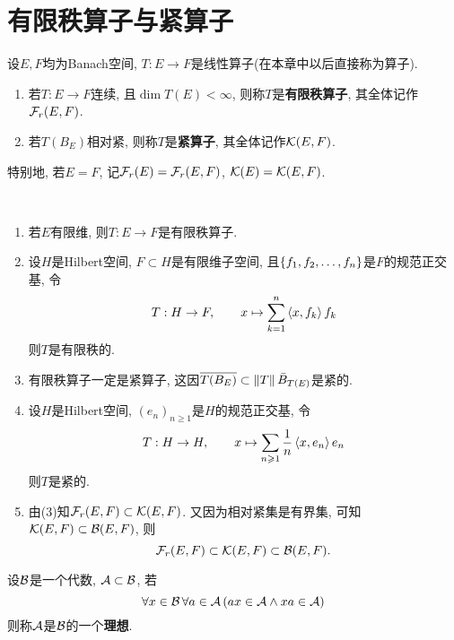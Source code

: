 \section{有限秩算子与紧算子}

    \begin{Definition}
    设$ E, F $均为Banach空间, $ T : E\to F $是线性算子(在本章中以后直接称为算子).
    \begin{enumerate}[(1)]
    \item 若$ T : E\to F $连续, 且$ \dim T(E)<\infty $, 则称$ T $是\textbf{有限秩算子}, 其全体记作$ \mathcal{F}_{r}(E,F) $.
    \item 若$ T(B_E) $相对紧, 则称$ T $是\textbf{紧算子}, 其全体记作$ \mathcal{K}(E,F) $.
    \end{enumerate}
    特别地, 若$ E=F $, 记$ \mathcal{F}_{r}(E)=\mathcal{F}_{r}(E,F) $, $ \mathcal{K}(E)=\mathcal{K}(E,F) $.
    \end{Definition}

    \begin{Example}~
    \begin{enumerate}[(1)]
    \item 若$ E $有限维, 则$ T : E\to F $是有限秩算子.
    \item 设$ H $是Hilbert空间, $ F\subset H $是有限维子空间, 且$ \{ f_{1}, f_{2}, \dots, f_{n} \} $是$ F $的规范正交基, 令
    \[
    T : H\to F,\qquad x\mapsto\sum_{k=1}^n\left\langle x,f_k \right\rangle f_k
    \]
    则$ T $是有限秩的.
    \item 有限秩算子一定是紧算子, 这因$ \overline{T(B_E)}\subset\left\| T \right\|\bar{B}_{T(E)} $是紧的.
    \item 设$ H $是Hilbert空间, $ (e_n)_{n\geqslant 1} $是$ H $的规范正交基, 令
    \[
    T : H\to H,\qquad x\mapsto\sum_{n\geqslant 1}\frac{1}{n}\left\langle x,e_n \right\rangle e_n
    \]
    则$ T $是紧的.
    \item 由(3)知$ \mathcal{F}_{r}(E,F)\subset\mathcal{K}(E,F) $. 又因为相对紧集是有界集, 可知$ \mathcal{K}(E,F)\subset\mathcal{B}(E,F) $, 则
    \[
    \mathcal{F}_{r}(E,F)\subset\mathcal{K}(E,F)\subset\mathcal{B}(E,F).
    \]
    \end{enumerate}
    \end{Example}

    \begin{Definition}[理想]
    设$ \mathcal{B} $是一个代数, $ \mathcal{A}\subset\mathcal{B} $, 若
    \[
    \forall x\in\mathcal{B}\,\forall a\in\mathcal{A}\,(ax\in\mathcal{A}\land xa\in\mathcal{A})
    \]
    则称$ \mathcal{A} $是$ \mathcal{B} $的一个\textbf{理想}.
    \end{Definition}

